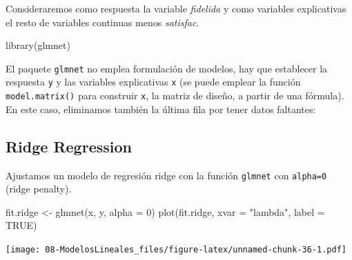 \documentclass[
]{book}
\newenvironment{Shaded}{\begin{snugshade}}{\end{snugshade}}
\newcommand{\AttributeTok}[1]{\textcolor[rgb]{0.77,0.63,0.00}{#1}}
\newcommand{\ConstantTok}[1]{\textcolor[rgb]{0.00,0.00,0.00}{#1}}
\newcommand{\DecValTok}[1]{\textcolor[rgb]{0.00,0.00,0.81}{#1}}
\newcommand{\FunctionTok}[1]{\textcolor[rgb]{0.00,0.00,0.00}{#1}}
\newcommand{\NormalTok}[1]{#1}
\newcommand{\OtherTok}[1]{\textcolor[rgb]{0.56,0.35,0.01}{#1}}
\newcommand{\SpecialCharTok}[1]{\textcolor[rgb]{0.00,0.00,0.00}{#1}}
\newcommand{\StringTok}[1]{\textcolor[rgb]{0.31,0.60,0.02}{#1}}
\theoremstyle{break}
\theoremstyle{nonumberplain}
\begin{document}
Consideraremos como respuesta la variable \emph{fidelida} y como variables explicativas
el resto de variables continuas menos \emph{satisfac}.

\begin{Shaded}
\begin{Highlighting}[]
\FunctionTok{library}\NormalTok{(glmnet)}
\end{Highlighting}
\end{Shaded}

El paquete \texttt{glmnet} no emplea formulación de modelos, hay que establecer la respuesta
\texttt{y} y las variables explicativas \texttt{x} (se puede emplear la función \texttt{model.matrix()} para construir \texttt{x},
la matriz de diseño, a partir de una fórmula).
En este caso, eliminamos también la última fila por tener datos faltantes:

\begin{Shaded}
\end{Shaded}

\hypertarget{ridge-regression}{%
\subsection{Ridge Regression}\label{ridge-regression}}

Ajustamos un modelo de regresión ridge con la función \texttt{glmnet} con \texttt{alpha=0} (ridge penalty).

\begin{Shaded}
\begin{Highlighting}[]
\NormalTok{fit.ridge }\OtherTok{\textless{}{-}} \FunctionTok{glmnet}\NormalTok{(x, y, }\AttributeTok{alpha =} \DecValTok{0}\NormalTok{)}
\FunctionTok{plot}\NormalTok{(fit.ridge, }\AttributeTok{xvar =} \StringTok{"lambda"}\NormalTok{, }\AttributeTok{label =} \ConstantTok{TRUE}\NormalTok{)}
\end{Highlighting}
\end{Shaded}

\texttt{[image: 08-ModelosLineales\_files/figure-latex/unnamed-chunk-36-1.pdf]}
\end{document}
